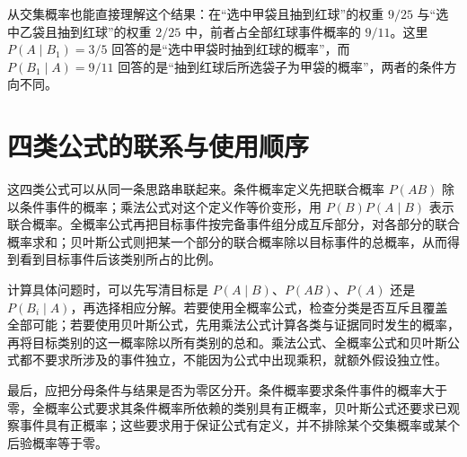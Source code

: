 \documentclass[UTF8,12pt,a4paper,fontset=fandol]{ctexart}
\begin{document}
从交集概率也能直接理解这个结果：在“选中甲袋且抽到红球”的权重 $9/25$ 与“选中乙袋且抽到红球”的权重 $2/25$ 中，前者占全部红球事件概率的 $9/11$。这里 $P(A\mid B_1)=3/5$ 回答的是“选中甲袋时抽到红球的概率”，而 $P(B_1\mid A)=9/11$ 回答的是“抽到红球后所选袋子为甲袋的概率”，两者的条件方向不同。

\section{四类公式的联系与使用顺序}
\label{sec:conditional-product-connections}

这四类公式可以从同一条思路串联起来。条件概率定义先把联合概率 $P(AB)$ 除以条件事件的概率；乘法公式对这个定义作等价变形，用 $P(B)P(A\mid B)$ 表示联合概率。全概率公式再把目标事件按完备事件组分成互斥部分，对各部分的联合概率求和；贝叶斯公式则把某一个部分的联合概率除以目标事件的总概率，从而得到看到目标事件后该类别所占的比例。

计算具体问题时，可以先写清目标是 $P(A\mid B)$、$P(AB)$、$P(A)$ 还是 $P(B_i\mid A)$，再选择相应分解。若要使用全概率公式，检查分类是否互斥且覆盖全部可能；若要使用贝叶斯公式，先用乘法公式计算各类与证据同时发生的概率，再将目标类别的这一概率除以所有类别的总和。乘法公式、全概率公式和贝叶斯公式都不要求所涉及的事件独立，不能因为公式中出现乘积，就额外假设独立性。

最后，应把分母条件与结果是否为零区分开。条件概率要求条件事件的概率大于零，全概率公式要求其条件概率所依赖的类别具有正概率，贝叶斯公式还要求已观察事件具有正概率；这些要求用于保证公式有定义，并不排除某个交集概率或某个后验概率等于零。
\end{document}
